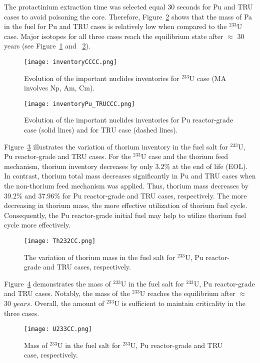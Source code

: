 The protactinium extraction time was selected equal 30 seconds for Pu and TRU 
cases to avoid poisoning the core. Therefore, 
Figure~\ref{fig:inventoryPu_TRUCCC} shows that the mass of Pa in the fuel for 
Pu and TRU cases is relatively low when compared to the $^{233}$U case. Major 
isotopes for all three cases reach the equilibrium state after $\approx$ $30$ 
years (see Figure~\ref{fig:inventoryCCCC} and ~\ref{fig:inventoryPu_TRUCCC}).
\begin{figure}
	\centering
	\texttt{[image: inventoryCCCC.png]}
	\vspace{-0.4in}
	\caption{Evolution of the important nuclides inventories for $^{233}$U 
		case (MA involves Np, Am, Cm).}
	\label{fig:inventoryCCCC}
\end{figure}
\begin{figure}
	\centering
	\texttt{[image: inventoryPu\_TRUCCC.png]}
	\vspace{-0.5in}
	\caption{Evolution of the important nuclides inventories for Pu 
		reactor-grade case (solid lines) and for TRU case (dashed lines).}
	\label{fig:inventoryPu_TRUCCC}
\end{figure}

Figure~\ref{fig:Th232CC} illustrates the variation of thorium inventory in the 
fuel salt for $^{233}$U, Pu reactor-grade and TRU cases. For the  
$^{233}$U case and the thorium feed mechanism, thorium inventory 
decreases by only $3.2$\% at the end of life (EOL). In contrast, thorium 
total mass decreases significantly in Pu and TRU cases when the non-thorium 
feed mechanism was applied. Thus, thorium mass decreases by $39.2$\% and 
$37.96$\% for Pu reactor-grade and TRU cases, respectively. The more   
decreasing in thorium mass, the more effective utilization of thorium fuel 
cycle. Consequently, the Pu reactor-grade initial fuel may help to utilize 
thorium fuel cycle more effectively.
\begin{figure}
	\centering
	\texttt{[image: Th232CC.png]}
	\caption{The variation of thorium mass in the fuel salt for $^{233}$U, Pu reactor-grade and TRU cases, respectively.}
	\label{fig:Th232CC}
\end{figure}

Figure~\ref{fig:U233CC} demonstrates the mass of $^{233}$U in the fuel salt 
for $^{233}$U, Pu reactor-grade and TRU cases. Notably, the mass of the 
$^{233}$U reaches the equilibrium after $\approx$ $30$ $years$. Overall, the 
amount of $^{233}$U is sufficient to maintain criticality in 
the three cases.
\begin{figure}
	\centering
	\texttt{[image: U233CC.png]}
	\caption{Mass of $^{233}$U in the fuel salt for $^{233}$U, Pu reactor-grade and TRU case, respectively.}
	\label{fig:U233CC}
\end{figure}

